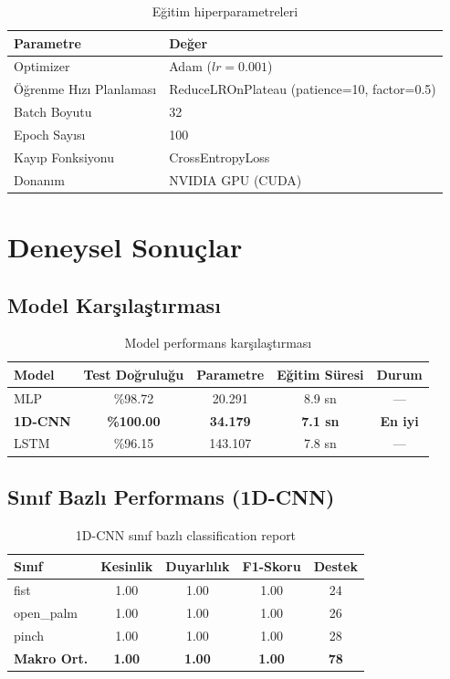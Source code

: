 \documentclass[12pt,a4paper]{article}
\begin{document}
\begin{table}[H]
\centering
\caption{Eğitim hiperparametreleri}
\begin{tabular}{@{}ll@{}}
\toprule
\textbf{Parametre} & \textbf{Değer} \\
\midrule
Optimizer & Adam ($lr = 0.001$) \\
Öğrenme Hızı Planlaması & ReduceLROnPlateau (patience=10, factor=0.5) \\
Batch Boyutu & 32 \\
Epoch Sayısı & 100 \\
Kayıp Fonksiyonu & CrossEntropyLoss \\
Donanım & NVIDIA GPU (CUDA) \\
\bottomrule
\end{tabular}
\end{table}

\section{Deneysel Sonuçlar}

\subsection{Model Karşılaştırması}

\begin{table}[H]
\centering
\caption{Model performans karşılaştırması}
\begin{tabular}{@{}lcccc@{}}
\toprule
\textbf{Model} & \textbf{Test Doğruluğu} & \textbf{Parametre} & \textbf{Eğitim Süresi} & \textbf{Durum} \\
\midrule
MLP & \%98.72 & 20.291 & 8.9 sn & --- \\
\textbf{1D-CNN} & \textbf{\%100.00} & \textbf{34.179} & \textbf{7.1 sn} & \textbf{En iyi} \\
LSTM & \%96.15 & 143.107 & 7.8 sn & --- \\
\bottomrule
\end{tabular}
\end{table}

\subsection{Sınıf Bazlı Performans (1D-CNN)}

\begin{table}[H]
\centering
\caption{1D-CNN sınıf bazlı classification report}
\begin{tabular}{@{}lcccc@{}}
\toprule
\textbf{Sınıf} & \textbf{Kesinlik} & \textbf{Duyarlılık} & \textbf{F1-Skoru} & \textbf{Destek} \\
\midrule
fist & 1.00 & 1.00 & 1.00 & 24 \\
open\_palm & 1.00 & 1.00 & 1.00 & 26 \\
pinch & 1.00 & 1.00 & 1.00 & 28 \\
\midrule
\textbf{Makro Ort.} & \textbf{1.00} & \textbf{1.00} & \textbf{1.00} & \textbf{78} \\
\bottomrule
\end{tabular}
\end{table}
\end{document}
